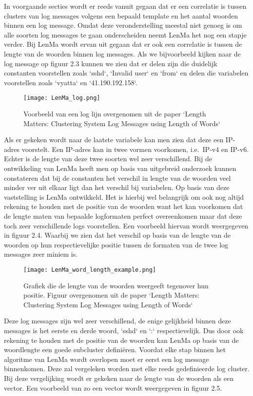 In voorgaande secties wordt er reeds vanuit gegaan dat er een correlatie is tussen clusters van log messages volgens een bepaald template en het aantal woorden binnen een log message. Omdat deze veronderstelling meestal niet genoeg is om alle soorten log messages te gaan onderscheiden neemt LenMa het nog een stapje verder. Bij LenMa wordt ervan uit gegaan dat er ook een correlatie is tussen de lengte van de woorden binnen log messages. Als we bijvoorbeeld kijken naar de log message op figuur 2.3 kunnen we zien dat er delen zijn die duidelijk constanten voorstellen zoals `sshd`, `Invalid user` en `from` en delen die variabelen voorstellen zoals `vyatta` en `41.190.192.158`.
\begin{figure}[!htp]
    \texttt{[image: LenMa\_log.png]}
    \caption{Voorbeeld van een log lijn overgenomen uit de paper `Length Matters: Clustering System Log Messages using Length of Words` \autocite{shima2016length}}
\end{figure}
Als er gekeken wordt naar de laatste variabele kan men zien dat deze een IP-adres voorstelt. Een IP-adres kan in twee vormen voorkomen, i.e.\ IP-v4 en IP-v6. Echter is de lengte van deze twee soorten wel zeer verschillend. Bij de ontwikkeling van LenMa heeft men op basis van uitgebreid onderzoek kunnen constateren dat bij de constanten het verschil in lengte van de woorden veel minder ver uit elkaar ligt dan het verschil bij variabelen. Op basis van deze vaststelling is LenMa  ontwikkeld. Het is hierbij wel belangrijk om ook nog altijd rekening te houden met de positie van de woorden want het kan voorkomen dat de lengte maten van bepaalde logformaten perfect overeenkomen maar dat deze toch zeer verschillende logs voorstellen. Een voorbeeld hiervan wordt weergegeven in figuur 2.4. Waarbij we zien dat het verschil op basis van de lengte van de woorden op hun respectievelijke positie tussen de formaten van de twee log messages zeer miniem is.
\begin{figure}[!htp]
    \texttt{[image: LenMa\_word\_length\_example.png]}
    \caption{Grafiek die de lengte van de woorden weergeeft tegenover hun positie. Figuur overgenomen uit de paper `Length Matters: Clustering System Log Messages using Length of Words` \autocite{shima2016length}}
\end{figure}
Deze log messages zijn wel zeer verschillend, de enige gelijkheid binnen deze messages is het eerste en derde woord, `sshd` en `:` respectievelijk. Dus door ook rekening te houden met de positie van de woorden kan LenMa op basis van de woordlengte een goede subcluster definiëren. Voordat elke stap binnen het algoritme van LenMa wordt overlopen moet er eerst een log message binnenkomen. Deze zal vergeleken worden met elke reeds gedefinieerde log cluster. Bij deze vergelijking wordt er gekeken naar de lengte van de woorden als een vector. Een voorbeeld van zo een vector wordt weergegeven in figuur 2.5. 
